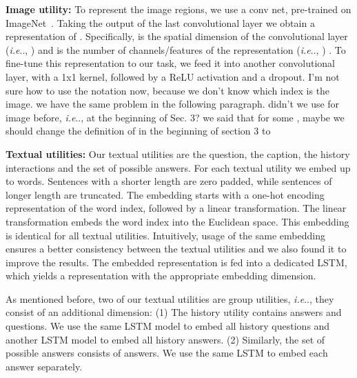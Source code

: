 \documentclass[10pt,twocolumn,letterpaper]{article}
\makeatletter
\newcommand{\alex}[1]{{\color{green}{Alex: #1}}}
\newcommand{\tamir}[1]{{\color{blue}{Tamir: #1}}}
\def\@onedot{\ifx\@let@token.\else.\null\fi\xspace}
\DeclareRobustCommand\onedot{\futurelet\@let@token\@onedot}
\def\ie{\emph{i.e}\onedot} \def\Ie{\emph{I.e}\onedot}
\makeatother
\begin{document}
\noindent\textbf{Image utility:} 
To represent the image regions, we use a  conv net,  pre-trained on ImageNet~\cite{imagenet_cvpr09}. Taking the output of the last convolutional layer we obtain a representation  of . Specifically,  is the spatial dimension of the convolutional layer (\ie, ) and  is the number of channels/features of the representation (\ie, ) \tamir{there is an inconsistency with the previous definiction where } \alex{I don't see that definition; where is it?}. To fine-tune this representation to our task, we feed it into another convolutional layer, with a 1x1 kernel, followed by a ReLU activation and a dropout.  
{\color{blue} I'm not sure how to use the notation now, because we don't know which index is the image. we have the same problem in the following paragraph.} {\color{green}didn't we use  for image before, \ie, at the beginning of Sec. 3?} 
{\color{red} we said that  for some , maybe we should change the definition of  in the beginning of section 3 to  }


\noindent\textbf{Textual utilities:} 
Our textual utilities are the question, the caption, the history interactions and the set of possible answers. For each textual utility  we embed up to  words. Sentences with a shorter length are zero padded, while sentences of longer length are truncated. The embedding starts with a one-hot encoding representation of the word index, followed by a linear transformation. The linear transformation embeds the word index into the Euclidean space. This embedding is identical for all  textual utilities. Intuitively, usage of the same embedding ensures a better consistency between the textual utilities and we also found it to improve the results. The embedded representation is fed into a dedicated LSTM, which yields a representation with the appropriate embedding dimension. 

As mentioned before, two of our textual utilities are group utilities, \ie, they consist of an additional dimension: (1) The history utility contains  answers and questions. We use the same LSTM model to embed all history questions and another LSTM model to embed all history answers. (2) Similarly, the set of possible answers consists of  answers. We use the same LSTM to embed each answer separately.   \alex{should we mention this second case when discussing group utilities in Sec. 3?}

\fi


 
\end{document}

